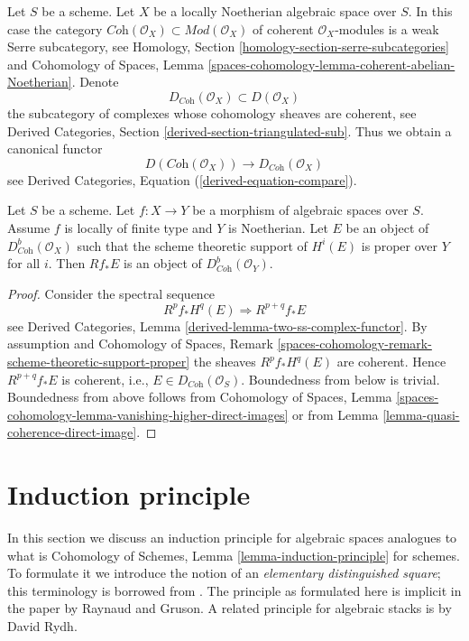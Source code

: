 \noindent
Let $S$ be a scheme. Let $X$ be a locally Noetherian algebraic space over $S$.
In this case the category
$\textit{Coh}(\mathcal{O}_X) \subset \textit{Mod}(\mathcal{O}_X)$
of coherent $\mathcal{O}_X$-modules is a weak Serre subcategory, see
Homology, Section \ref{homology-section-serre-subcategories}
and
Cohomology of Spaces, Lemma
\ref{spaces-cohomology-lemma-coherent-abelian-Noetherian}.
Denote
$$
D_{\textit{Coh}}(\mathcal{O}_X) \subset D(\mathcal{O}_X)
$$
the subcategory of complexes whose cohomology sheaves are coherent, see
Derived Categories, Section \ref{derived-section-triangulated-sub}.
Thus we obtain a canonical functor
\begin{equation}
\label{equation-compare-coherent}
D(\textit{Coh}(\mathcal{O}_X))
\longrightarrow
D_{\textit{Coh}}(\mathcal{O}_X)
\end{equation}
see Derived Categories, Equation (\ref{derived-equation-compare}).

\begin{lemma}
\label{lemma-direct-image-coherent}
Let $S$ be a scheme. Let $f : X \to Y$ be a morphism of algebraic spaces
over $S$. Assume $f$ is locally of finite type and $Y$ is Noetherian.
Let $E$ be an object of $D^b_{\textit{Coh}}(\mathcal{O}_X)$ such that the
scheme theoretic support of $H^i(E)$ is proper over $Y$ for all $i$.
Then $Rf_*E$ is an object of $D^b_{\textit{Coh}}(\mathcal{O}_Y)$.
\end{lemma}

\begin{proof}
Consider the spectral sequence
$$
R^pf_*H^q(E) \Rightarrow R^{p + q}f_*E
$$
see Derived Categories, Lemma \ref{derived-lemma-two-ss-complex-functor}.
By assumption and
Cohomology of Spaces, Remark
\ref{spaces-cohomology-remark-scheme-theoretic-support-proper}
the sheaves $R^pf_*H^q(E)$ are coherent. Hence
$R^{p + q}f_*E$ is coherent, i.e., $E \in D_{\textit{Coh}}(\mathcal{O}_S)$.
Boundedness from below is trivial. Boundedness from above
follows from
Cohomology of Spaces, Lemma
\ref{spaces-cohomology-lemma-vanishing-higher-direct-images}
or from
Lemma \ref{lemma-quasi-coherence-direct-image}.
\end{proof}




\section{Induction principle}
\label{section-induction}

\noindent
In this section we discuss an induction principle for algebraic spaces
analogues to what is
Cohomology of Schemes, Lemma \ref{lemma-induction-principle}
for schemes. To formulate it we introduce the notion of an
{\it elementary distinguished square}; this terminology is borrowed
from \cite{MV}.
The principle as formulated here is implicit in the paper \cite{GruRay}
by Raynaud and Gruson.
A related principle for algebraic stacks is
\cite[Theorem D]{rydh_etale_devissage} by David Rydh.

